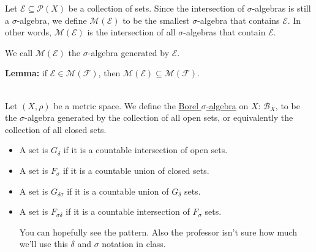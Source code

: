 \documentclass{book}
\newcommand{\hOne}{%
   \color{Black}%
   \fontsize{14}{16}\selectfont%
}
\newcommand{\hTwo}{%
\color{MidnightBlue}%
   \fontsize{13}{15}\selectfont%
}
\newcommand{\myComment}{%
   \color{RawerSienna}%
   \fontsize{12}{14}\selectfont%
}
\newenvironment{myIndent}{%
   \begin{adjustwidth}{2.5em}{0em}%
}{%
   \end{adjustwidth}%
}
\newenvironment{myTindent}{%
   \begin{adjustwidth}{7.5em}{0em}%
}{%
   \end{adjustwidth}%
}
\newcommand{\udefine}[1]{{%
   \setulcolor{Red}%
   \setul{0.14em}{0.07em}%
   \ul{#1}%
}}
\newcommand{\blab}[1]{\textbf{#1}}
\newcommand{\mySepTwo}[1][.]{%
   {\noindent\color{#1}{\rule{6.5in}{0.5mm}}}\\%
}
\newcommand{\retTwo}{\hfill\bigbreak}
\begin{document}
\hOne Let $\mathcal{E} \subseteq \mathcal{P}(X)$ be a collection of sets. Since the intersection of $\sigma$-algebras is still a $\sigma$-algebra, we define $\mathcal{M}(\mathcal{E})$ to be the smallest $\sigma$-algebra that contains $\mathcal{E}$. In other words, $\mathcal{M}(\mathcal{E})$ is the intersection of all $\sigma$-algebras that contain $\mathcal{E}$.\retTwo

We call $\mathcal{M}(\mathcal{E})$ the $\sigma$-algebra generated by $\mathcal{E}$.


\begin{myIndent}\hTwo
   \blab{Lemma:} if $\mathcal{E} \in \mathcal{M}(\mathcal{F})$, then $\mathcal{M}(\mathcal{E}) \subseteq \mathcal{M}(\mathcal{F})$.
\end{myIndent}

\mySepTwo

Let $(X, \rho)$ be a metric space. We define the \udefine{Borel $\sigma$-algebra} on $X$: $\mathcal{B}_X$, to be the $\sigma$-algebra generated by the collection of all open sets, or equivalently the collection of all closed sets.

\begin{itemize}
   \item A set is $G_\delta$ if it is a countable intersection of open sets.
   \item A set is $F_\sigma$ if it is a countable union of closed sets.
   \item A set is $G_{\delta\sigma}$ if it is a countable union of $G_\delta$ sets.
   \item A set is $F_{\sigma\delta}$ if it is a countable intersection of $F_\sigma$ sets.
   \begin{myTindent}\myComment
      You can hopefully see the pattern. Also the professor isn't sure how much we'll use this $\delta$ and $\sigma$ notation in class.
   \end{myTindent}
\end{itemize}
\end{document}
